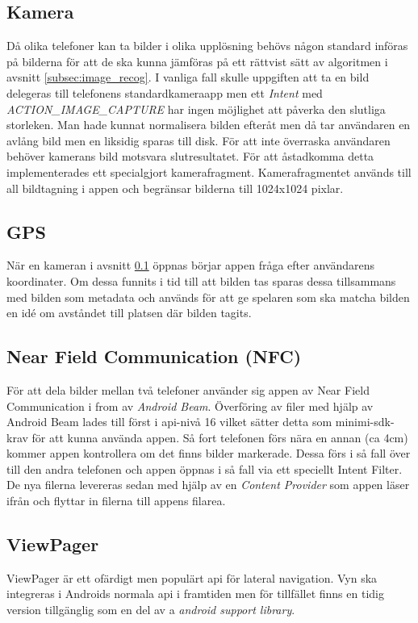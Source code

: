 \documentclass[11px, a4paper]{article}
\begin{document}
\subsection{Kamera}
\label{subsec:camera}
	Då olika telefoner kan ta bilder i olika upplösning behövs någon standard införas på bilderna för att de ska kunna jämföras på ett rättvist sätt av algoritmen i avsnitt \ref{subsec:image_recog}. I vanliga fall skulle uppgiften att ta en bild delegeras till telefonens standardkameraapp men ett \emph{Intent} med \emph{ACTION\_IMAGE\_CAPTURE} har ingen möjlighet att påverka den slutliga storleken. Man hade kunnat normalisera bilden efteråt men då tar användaren en avlång bild men en liksidig sparas till disk. För att inte överraska användaren behöver kamerans bild motsvara slutresultatet. För att åstadkomma detta implementerades ett specialgjort kamerafragment. Kamerafragmentet används till all bildtagning i appen och begränsar bilderna till 1024x1024 pixlar.

\subsection{GPS}
	När en kameran i avsnitt \ref{subsec:camera} öppnas börjar appen fråga efter användarens koordinater. Om dessa funnits i tid till att bilden tas sparas dessa tillsammans med bilden som metadata och används för att ge spelaren som ska matcha bilden en idé om avståndet till platsen där bilden tagits.

\subsection{Near Field Communication (NFC)}
	För att dela bilder mellan två telefoner använder sig appen av Near Field Communication i from av \emph{Android Beam}. Överföring av filer med hjälp av Android Beam lades till först i api-nivå 16 vilket sätter detta som minimi-sdk-krav för att kunna använda appen. Så fort telefonen förs nära en annan (ca 4cm) kommer appen kontrollera om det finns bilder markerade. Dessa förs i så fall över till den andra telefonen och appen öppnas i så fall via ett speciellt Intent Filter. De nya filerna levereras sedan med hjälp av en \emph{Content Provider} som appen läser ifrån och flyttar in filerna till appens filarea.

\subsection{ViewPager}
\label{subsec:viewpager}
	ViewPager är ett ofärdigt\cite{ViewPager} men populärt api för lateral navigation. Vyn ska integreras i Androids normala api i framtiden men för tillfället finns en tidig version tillgänglig som en del av a \emph{android support library}.
\end{document}
